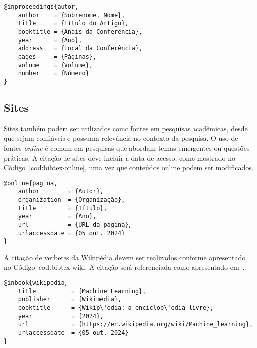 \documentclass[
    12pt
    ,oneside
    ,a4paper
    ,chapter=TITLE
    ,section=TITLE
    ,sumario=abnt-6027-2012]{abntex2}
\begin{document}
\begin{codigo}[htb]
\begin{lstlisting}
@inproceedings{autor,
    author    = {Sobrenome, Nome},
    title     = {Título do Artigo},
    booktitle = {Anais da Conferência},
    year      = {Ano},
    address   = {Local da Conferência},
    pages     = {Páginas},
    volume    = {Volume},
    number    = {Número}
}
\end{lstlisting}
\fonteautor
\end{codigo}

\subsection{Sites}

Sites também podem ser utilizados como fontes em pesquisas acadêmicas, desde que sejam confiáveis e possuam relevância no contexto da pesquisa. O uso de fontes \textit{online} é comum em pesquisas que abordam temas emergentes ou questões práticas. A citação de sites deve incluir a data de acesso, como mostrado no Código~\ref{cod:bibtex-online}, uma vez que conteúdos online podem ser modificados.

\begin{codigo}[htb]
\begin{lstlisting}
@online{pagina,
    author        = {Autor},
    organization  = {Organização},
    title         = {Título},
    year          = {Ano},
    url           = {URL da página},
    urlaccessdate = {05 out. 2024}
}
\end{lstlisting}
\fonteautor
\end{codigo}

A citação de verbetes da Wikipédia devem ser realizados conforme apresentado no Código~{cod:bibtex-wiki}. A citação será referenciada como apresentado em~.

\begin{codigo}[htb]
\begin{lstlisting}
@inbook{wikipedia,
    title          = {Machine Learning},
    publisher      = {Wikimedia},
    booktitle      = {Wikip\'edia: a enciclop\'edia livre},
    year           = {2024},
    url            = {https://en.wikipedia.org/wiki/Machine_learning},
    urlaccessdate  = {05 out. 2024}
}
\end{lstlisting}
\fonteautor
\end{codigo}
\end{document}
